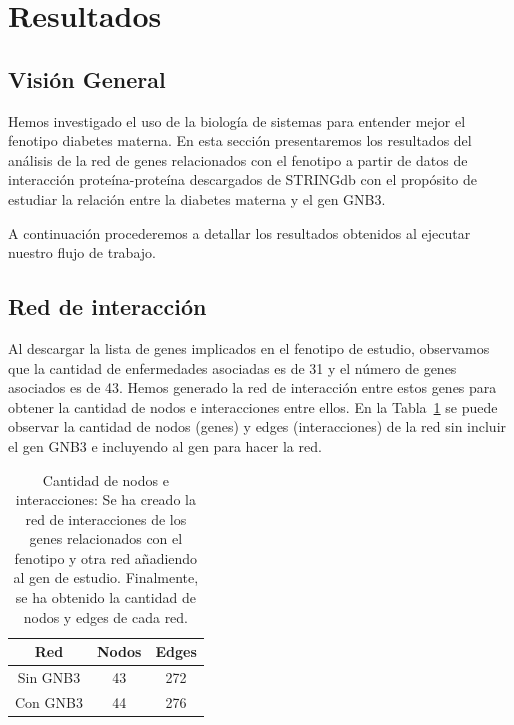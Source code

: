 
\section{Resultados}

\subsection{Visión General}

Hemos investigado el uso de la biología de sistemas para entender mejor el fenotipo diabetes materna. En esta sección presentaremos los resultados del análisis de la red de genes relacionados con el fenotipo a partir de datos de interacción proteína-proteína descargados de STRINGdb con el propósito de estudiar la relación entre la diabetes materna y el gen GNB3.

A continuación procederemos a detallar los resultados obtenidos al ejecutar nuestro flujo de trabajo.

\subsection{Red de interacción}

Al descargar la lista de genes implicados en el fenotipo de estudio, observamos que la cantidad de enfermedades asociadas es de 31 y el número de genes asociados es de 43. Hemos generado la red de interacción entre estos genes para obtener la cantidad de nodos e interacciones entre ellos. En la Tabla~\ref{table:nodes_edges_count} se puede observar la cantidad de nodos (genes) y edges (interacciones) de la red sin incluir el gen GNB3 e incluyendo al gen para hacer la red.


\begin{table}[h]
	\centering
	\caption{Cantidad de nodos e interacciones: Se ha creado la red de interacciones de los genes relacionados con el fenotipo y otra red añadiendo al gen de estudio. Finalmente, se ha obtenido la cantidad de nodos y edges de cada red.}
	\label{table:nodes_edges_count}
	\begin{tabular}{|c|c|c|}
		\hline
		\textbf{Red} & \textbf{Nodos} & \textbf{Edges} \\ \hline
		Sin GNB3 & 43    & 272   \\ \hline
		Con GNB3 & 44    & 276  \\ \hline
	\end{tabular}

\end{table}

